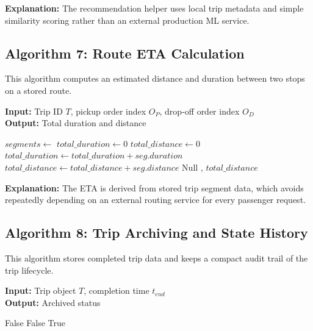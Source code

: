 \textbf{Explanation:} The recommendation helper uses local trip metadata and simple similarity scoring rather than an external production ML service.

\subsection{Algorithm 7: Route ETA Calculation}

This algorithm computes an estimated distance and duration between two stops on a stored route.

\begin{breakablealgorithm}
\caption{Dynamic Route Segment ETA Calculation}
\textbf{Input:} Trip ID $T$, pickup order index $O_P$, drop-off order index $O_D$ \\
\textbf{Output:} Total duration and distance
\begin{algorithmic}[1]
    \State $segments \gets$ 
    \State $total\_duration \gets 0$
    \State $total\_distance \gets 0$
            \State $total\_duration \gets total\_duration + seg.duration$
            \State $total\_distance \gets total\_distance + seg.distance$
        \EndIf
    \EndFor
        \State \Return Null
    \EndIf
    \State \Return {}, $total\_distance$
\EndFunction
\end{algorithmic}
\end{breakablealgorithm}

\textbf{Explanation:} The ETA is derived from stored trip segment data, which avoids repeatedly depending on an external routing service for every passenger request.

\subsection{Algorithm 8: Trip Archiving and State History}

This algorithm stores completed trip data and keeps a compact audit trail of the trip lifecycle.

\begin{breakablealgorithm}
\caption{Trip Archiving and State History}
\textbf{Input:} Trip object $T$, completion time $t_{end}$ \\
\textbf{Output:} Archived status
\begin{algorithmic}[1]
        \State \Return False
    \EndIf
        \State \Return False
    \EndIf
    \State {}
    \State {}
    \State {}
    \State \Return True
\EndFunction
\end{algorithmic}
\end{breakablealgorithm}

